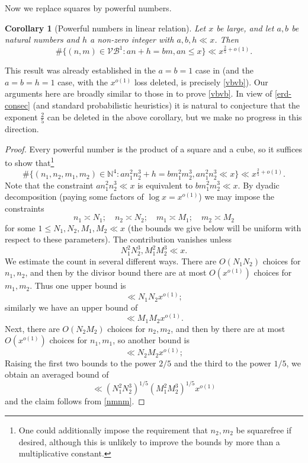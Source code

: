 \documentclass[12pt]{amsart}
\newtheorem{corollary}[theorem]{Corollary}
\newcommand{\N}{\mathbb{N}}
\begin{document}
Now we replace squares by powerful numbers.

\begin{corollary}[Powerful numbers in linear relation]\label{powercount} Let $x$ be large, and let $a,b$ be natural numbers and $h$ a non-zero integer with $a, b, h \ll x$.  Then
 $$ \# \{ (n,m) \in \mathcal{VB}^1: an+h = bm, an \leq x \} \ll x^{\frac{2}{5}+o(1)}.$$
\end{corollary}

This result was already established in the $a=b=1$ case in \cite{chan} (and the $a=b=h=1$ case, with the $x^{o(1)}$ loss deleted, is precisely \eqref{vbvb}).  Our arguments here are broadly similar to those in \cite{aktas} to prove \eqref{vbvb}.  In view of \eqref{erd-consec} (and standard probabilistic heuristics) it is natural to conjecture that the exponent $\frac{2}{5}$ can be deleted in the above corollary, but we make no progress in this direction.

\begin{proof} Every powerful number is the product of a square and a cube, so it suffices to show that\footnote{One could additionally impose the requirement that $n_2, m_2$ be squarefree if desired, although this is unlikely to improve the bounds by more than a multiplicative constant.}
$$ \# \{ (n_1,n_2,m_1,m_2) \in \N^4: an_1^2 n_2^3+h = bm_1^2 m_2^3, a n_1^2 n_2^3 \ll x \} \ll x^{\frac{2}{5}+o(1)}.$$
Note that the constraint $a n_1^2 n_2^3 \ll x$ is equivalent to $b m_1^2 m_2^3 \ll x$.
By dyadic decomposition (paying some factors of $\log x = x^{o(1)}$) we may impose the constraints
$$ n_1 \asymp N_1; \quad n_2 \asymp N_2; \quad m_1 \asymp M_1; \quad m_2 \asymp M_2$$
for some $1 \leq N_1,N_2,M_1,M_2 \ll x$ (the bounds we give below will be uniform with respect to these parameters). The contribution vanishes unless
\begin{equation}\label{nmnm}
 N_1^2 N_2^3, M_1^2 M_2^3 \ll x.
\end{equation}
We estimate the count in several different ways.  There are $O(N_1 N_2)$ choices for $n_1, n_2$, and then by the divisor bound there are at most $O(x^{o(1)})$ choices for $m_1,m_2$.  Thus one upper bound is
$$ \ll N_1 N_2 x^{o(1)};$$
similarly we have an upper bound of
$$ \ll M_1 M_2 x^{o(1)}.$$
Next, there are $O(N_2 M_2)$ choices for $n_2, m_2$, and then by  there are at most $O(x^{o(1)})$ choices for $n_1, m_1$, so another bound is
$$ \ll N_2 M_2 x^{o(1)};$$
Raising the first two bounds to the power $2/5$ and the third to the power $1/5$, we obtain an averaged bound of
$$ \ll (N_1^2 N_2^3)^{1/5} (M_1^2 M_2^3)^{1/5} x^{o(1)}$$
and the claim follows from \eqref{nmnm}.
\end{proof}
\end{document}
